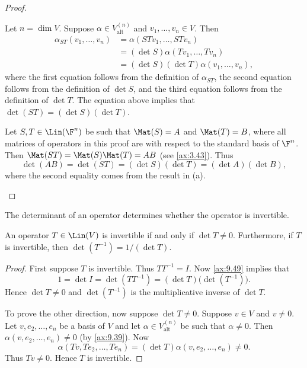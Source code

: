 \begin{proof}\leavevmode
\begin{parts}
\item Let $n=\dim V$. Suppose $\alpha\in V_{\mathrm{alt}}^{(n)}$ and
  $v_1,\dots,v_n\in V$. Then
  \begin{align*}
  \alpha_{ST}(v_1,\dots,v_n) &= \alpha(STv_1,\dots,STv_n)\\
    &= (\det S)\alpha(Tv_1,\dots,Tv_n)\\
    &= (\det S)(\det T)\alpha(v_1,\dots,v_n),
  \end{align*}
  where the first equation follows from the definition of $\alpha_{ST}$, the
  second equation follows from the definition of $\det S$, and the third
  equation follows from the definition of $\det T$. The equation above implies
  that $\det(ST)=(\det S)(\det T)$.
\item Let $S,T\in\Lin(\F^n)$ be such that $\Mat(S)=A$ and $\Mat(T)=B$, where
  all matrices of operators in this proof are with respect to the standard
  basis of $\F^n$. Then $\Mat(ST)=\Mat(S)\Mat(T)=AB$ (see \ref{ax:3.43}). Thus
  \[ \det(AB) = \det(ST) = (\det S)(\det T) = (\det A)(\det B), \]
  where the second equality comes from the result in (a). \qedhere
\end{parts}
\end{proof}

The determinant of an operator determines whether the operator is invertible.

\begin{result}\label{ax:9.50}
An operator $T\in\Lin(V)$ is invertible if and only if $\det T\ne0$.
Furthermore, if $T$ is invertible, then $\det(T^{-1})=1/(\det T)$.
\end{result}

\begin{proof}
First suppose $T$ is invertible. Thus $TT^{-1}=I$. Now \ref{ax:9.49} implies
that
\[ 1 = \det I = \det(TT^{-1}) = (\det T)\bigl(\det(T^{-1})\bigr). \]
Hence $\det T\ne0$ and $\det(T^{-1})$ is the multiplicative inverse of
$\det T$.

To prove the other direction, now suppose $\det T\ne0$. Suppose $v\in V$ and
$v\ne0$. Let $v,e_2,\dots,e_n$ be a basis of $V$ and let
$\alpha\in V_{\mathrm{alt}}^{(n)}$ be such that $\alpha\ne0$. Then
$\alpha(v,e_2,\dots,e_n)\ne0$ (by \ref{ax:9.39}). Now
\[ \alpha(Tv,Te_2,\dots,Te_n) = (\det T)\alpha(v,e_2,\dots,e_n) \ne 0. \]
Thus $Tv\ne0$. Hence $T$ is invertible.
\end{proof}

